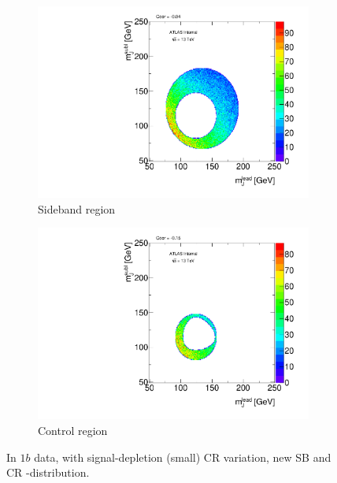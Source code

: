 \begin{figure}[htbp!]
\centering
\captionsetup{justification=centering}
    \begin{subfigure}[b]{0.39\textwidth}
        \includegraphics[width=\textwidth,angle=-90]{figures/boosted/Syst_CRSB/CR_Small_Sideband_OneTag_mH0H1.pdf}
        \caption{Sideband region}
        \label{CRSB:CR_Small_SB}
    \end{subfigure}
    \quad
    \begin{subfigure}[b]{0.39\textwidth}
        \includegraphics[width=\textwidth,angle=-90]{figures/boosted/Syst_CRSB/CR_Small_Control_OneTag_mH0H1.pdf}
        \caption{Control region}
        \label{CRSB:CR_Small_CR}
    \end{subfigure}
\caption{In $1b$ data, with signal-depletion (small) CR variation, new SB and CR \mleadJ-\msublJ distribution.}
\label{CRSB:CR_Small}
\end{figure}

